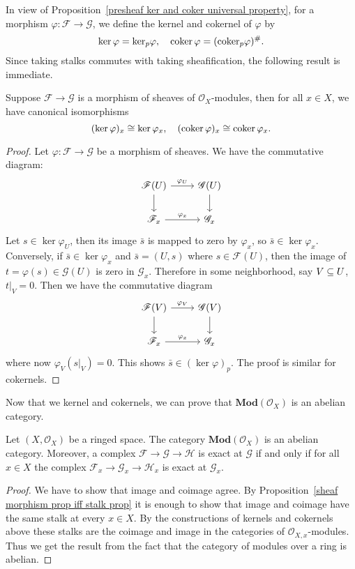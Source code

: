 In view of Proposition~\ref{presheaf ker and coker universal property}, for a morphism $\varphi:\mathscr{F}\to\mathscr{G}$, we define the kernel and cokernel of $\varphi$ by
\[\operatorname{ker}\varphi=\mathrm{ker}_p\varphi,\quad \operatorname{coker}\varphi=(\mathrm{coker}_p\varphi)^{\#}.\]
Since taking stalks commutes with taking sheafification, the following result is immediate.
\begin{proposition}\label{sheaf ker coker and stalk prop}
Suppose $\mathscr{F}\to\mathscr{G}$ is a morphism of sheaves of $\mathscr{O}_X$-modules, then for all $x\in X$, we have canonical isomorphisms
\[(\operatorname{ker}\varphi)_x\cong\operatorname{ker}\varphi_x,\quad(\operatorname{coker}\varphi)_x\cong\operatorname{coker}\varphi_x.\]
\end{proposition}
\begin{proof}
Let $\varphi:\mathscr{F}\to\mathscr{G}$ be a morphism of sheaves. We have the commutative diagram:
\[\begin{tikzcd}
\mathscr{F}(U)\ar[r,"\varphi_U"]\ar[d]&\mathscr{G}(U)\ar[d]\\
\mathscr{F}_x\ar[r,"\varphi_x"]&\mathscr{G}_x
\end{tikzcd}\]
Let $s\in\ker\varphi_U$, then its image $\bar{s}$ is mapped to zero by $\varphi_x$, so $\bar{s}\in\ker\varphi_x$. Conversely, if $\bar{s}\in\ker\varphi_x$ and $\bar{s}=(U,s)$ where $s\in\mathscr{F}(U)$, then the image of $t=\varphi(s)\in\mathscr{G}(U)$ is zero in $\mathscr{G}_x$. Therefore in some neighborhood, say $V\subseteq U$, $t|_V=0$. Then we have the commutative diagram
\[\begin{tikzcd}
\mathscr{F}(V)\ar[r,"\varphi_V"]\ar[d]&\mathscr{G}(V)\ar[d]\\
\mathscr{F}_x\ar[r,"\varphi_x"]&\mathscr{G}_x
\end{tikzcd}\]
where now $\varphi_V(s|_V)=0$. This shows $\bar{s}\in(\ker\varphi)_p$. The proof is similar for cokernels.
\end{proof}
Now that we kernel and cokernels, we can prove that $\mathbf{Mod}(\mathscr{O}_X)$ is an abelian category.
\begin{theorem}\label{sheaf of module abelian cat exactness char}
Let $(X,\mathscr{O}_X)$ be a ringed space. The category $\mathbf{Mod}(\mathscr{O}_X)$ is an abelian category. Moreover, a complex $\mathscr{F}\to\mathscr{G}\to\mathscr{H}$ is exact at $\mathscr{G}$ if and only if for all $x\in X$ the complex $\mathscr{F}_x\to\mathscr{G}_x\to\mathscr{H}_x$ is exact at $\mathscr{G}_x$.
\end{theorem}
\begin{proof}
We have to show that image and coimage agree. By Proposition~\ref{sheaf morphism prop iff stalk prop} it is enough to show that image and coimage have the same stalk at every $x\in X$. By the constructions of kernels and cokernels above these stalks are the coimage and image in the categories of $\mathscr{O}_{X,x}$-modules. Thus we get the result from the fact that the category of modules over a ring is abelian.
\end{proof}
